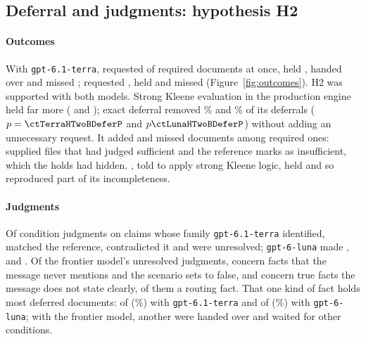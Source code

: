 \subsection{Deferral and judgments: hypothesis H2}
\label{sec:results-uncertainty}

\paragraph{Outcomes}
With \texttt{gpt-6.1-terra}, \casepath requested \pct{\tenTerraCPxRecall} of required documents at once, held \pct{\tenTerraCPxHeld}, handed \pct{\tenTerraCPxHanded} over and missed \pct{\tenTerraCPxMiss};  requested \pct{\tenTerraBoneRecall}, held \pct{\tenTerraBoneHeld} and missed \pct{\tenTerraBoneMiss} (Figure~\ref{fig:outcomes}). H2 was supported with both models. Strong Kleene evaluation in the production engine held far more (\pct{\tenTerraCPkHeld} and \pct{\tenLunaCPkHeld}); exact deferral removed \tenTerraExactCut\% and \tenLunaExactCut\% of its deferrals ($p=\ctTerraHTwoBDeferP$ and $p\ctLunaHTwoBDeferP$) without adding an unnecessary request. It added \tenTerraExactAddedMiss{} and \tenLunaExactAddedMiss{} missed documents among \tenTerraExactNR{} required ones: supplied files that \casepath had judged sufficient and the reference marks as insufficient, which the holds had hidden. , told to apply strong Kleene logic, held \pct{\tenTerraBtwoHeld} and so reproduced part of its incompleteness.

\paragraph{Judgments}
Of \jaTotal{} condition judgments on claims whose family \texttt{gpt-6.1-terra} identified, \jaCorrect{} matched the reference, \jaFlipped{} contradicted it and \jaUnres{} were unresolved; \texttt{gpt-6-luna} made \jaLunaCorrect, \jaLunaFlipped{} and \jaLunaUnres. Of the frontier model's unresolved judgments, \jaUnresFalse{} concern facts that the message never mentions and the scenario sets to false, and \jaUnresTrue{} concern true facts the message does not state clearly, \jaUnresRouting{} of them a routing fact. That one kind of fact holds most deferred documents:  of  (\%) with \texttt{gpt-6.1-terra} and  of  (\%) with \texttt{gpt-6-luna}; with the frontier model, another  were handed over and  waited for other conditions.

